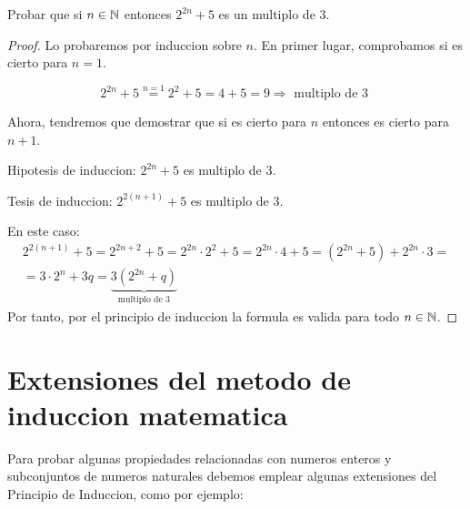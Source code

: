 \begin{example}
	Probar que si \(n \in  \mathbb{N} \) entonces \(2^{2n} + 5 \) es un multiplo de 3.
\end{example}
\begin{proof}
	Lo probaremos por induccion sobre \(n \). En primer lugar, comprobamos si es cierto para \(n = 1\).
	
	\[
		2^{2n} + 5 \overset{n=1}{=} 2^{2} + 5 = 4 + 5 = 9 \Rightarrow \text{ multiplo de 3 }
	\]
	
	Ahora, tendremos que demostrar que si es cierto para \(n \) entonces es cierto para \(n + 1 \).
	
	Hipotesis de induccion: \(2^{2n} + 5 \) es multiplo de 3.
	
	Tesis de induccion: \(2^{2(n+1)} + 5\) es multiplo de 3.
	
	En este caso:
	\begin{multline*}
		2^{2(n+1)} + 5 = 2^{2n + 2} + 5 = 2^{2n} \cdot 2^{2} + 5 = 2^{2n} \cdot 4 + 5 = (2^{2n} + 5 ) + 2^{2n} \cdot 3 = \\
		= 3 \cdot 2^{n} + 3q = \underbrace{3(2^{2n} + q)}_{\text{multiplo de 3}}
	\end{multline*}
	Por tanto, por el principio de induccion la formula es valida para todo \(n \in  \mathbb{N} \).
\end{proof}

\section{Extensiones del metodo de induccion matematica}

Para probar algunas propiedades relacionadas con numeros enteros y subconjuntos de numeros naturales debemos emplear algunas extensiones del Principio de Induccion, como por ejemplo:

